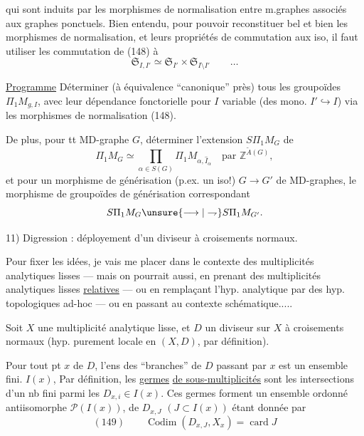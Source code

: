 qui sont induits par les morphismes de normalisation entre m.graphes associés aux graphes ponctuels. Bien entendu, pour pouvoir reconstituer bel et bien les  morphismes de normalisation, et leurs propriétés de commutation aux iso, il faut utiliser les  commutation de (148) à
\[
\mathfrak S_{I,I'}\simeq\mathfrak S_{I'}\times\mathfrak S_{I\setminus I'}\qquad\ldots
\]

\uline{Programme} Déterminer (à équivalence ``canonique'' près) tous les groupoïdes $\Pi_1M_{g,I}$, avec leur dépendance fonctorielle pour  $I$ variable (des mono. $I'\hookrightarrow I$) via les morphismes de normalisation (148).

De plus, pour tt MD-graphe $G$, déterminer l'extension $S\Pi_1M_G$ de
\[
\Pi_1M_G\simeq\prod_{\alpha\in S(G)}\Pi_1M_{\alpha,\widehat I_\alpha}\quad\text{par }\mathbb Z^{\widetilde A(G)},
\]
et pour un morphisme de générisation (p.ex. un iso!)  $G\longrightarrow G'$ de MD-graphes,  le morphisme de groupoïdes de générisation correspondant
\[
S\Pi_1M_G\unsure{\longrightarrow|\rightharpoondown}S\Pi_1M_{G'}.
\]

11) Digression : déployement d'un diviseur à croisements normaux.

Pour fixer les idées, je vais me placer dans le contexte des multiplicités analytiques lisses — mais on pourrait aussi, en prenant des multiplicités analytiques lisses \uline{relatives} — ou en remplaçant l'hyp. analytique par des hyp. topologiques ad-hoc — ou en passant au contexte schématique.....

Soit $X$ une multiplicité analytique lisse, et $D$ un diviseur sur $X$ à croisements normaux (hyp. purement locale en $(X,D)$, par définition). 

Pour tout pt $x$ de $D$, l'ens des ``branches'' de $D$ passant par $x$ est un ensemble fini. $I(x)$, Par définition, les \uline{germes}  \uline{de sous-multiplicités}   sont les intersections d'un nb fini  parmi les $D_{x,i}\in I(x)$.
Ces germes forment un ensemble ordonné  antiisomorphe  $\mathcal P(I(x))$,   de $D_{x,J}$ $(J\subset I(x))$ étant donnée par
\[
(149)\qquad \operatorname{Codim}(D_{x,J},X_x)=\operatorname{card}J
\]


